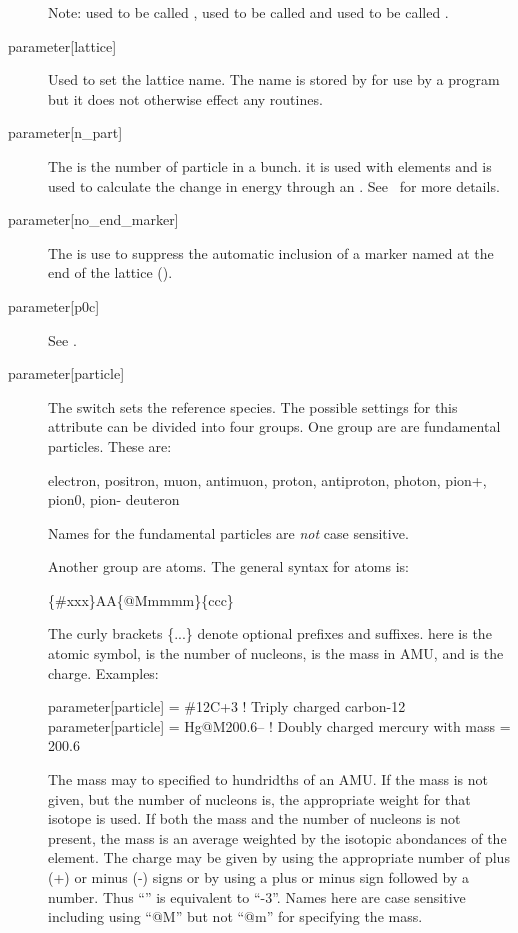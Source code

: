 \begin{description}
Note:  used to be called , 
used to be called  and  used to be
called .
  \item[{parameter[lattice]}] \Newline
Used to set the lattice name. The  name is stored by \bmad
for use by a program but it does not otherwise effect any \bmad
routines.
  \item[{parameter[n_part]}] \Newline
The  is the number of particle in a bunch.
it is used with  elements and is used to calculate the
change in energy through an . See~ for more
details.
  \item[{parameter[no_end_marker]}] \Newline
The  is use to suppress the automatic inclusion
of a marker named  at the end of the lattice (). 
  \item[{parameter[p0c]}] \Newline
See .
  \item[{parameter[particle]}] \Newline
The  switch sets the reference species. The possible settings for
this attribute can be divided into four groups. One group are are fundamental
particles. These are:
\begin{example}
  electron,  positron,
  muon,      antimuon,
  proton,    antiproton,
  photon, 
  pion+,      pion0,      pion-
  deuteron
\end{example}
Names for the fundamental particles are {\em not} case sensitive.

Another group are atoms. The general syntax for atoms is:
\begin{example}
  \{\#xxx\}AA\{@Mmmmm\}\{ccc\}
\end{example}
The curly brackets \{...\} denote optional prefixes and suffixes.  here is the
atomic symbol,  is the number of nucleons,  is the mass in AMU, and 
is the charge. Examples:
\begin{example}
  parameter[particle] = \#12C+3       ! Triply charged carbon-12
  parameter[particle] = Hg@M200.6--  ! Doubly charged mercury with mass = 200.6
\end{example}
The mass may to specified to hundridths of an AMU. If the mass is not given, but the
number of nucleons is, the appropriate weight for that isotope is used. If both the mass
and the number of nucleons is not present, the mass is an average weighted by the isotopic
abondances of the element. The charge may be given by using the appropriate number of plus
(+) or minus (-) signs or by using a plus or minus sign followed by a number. Thus
``\vn{-{-}-}'' is equivalent to ``-3''. Names here are case sensitive including using ``@M''
but not ``@m'' for specifying the mass.


\end{description}
